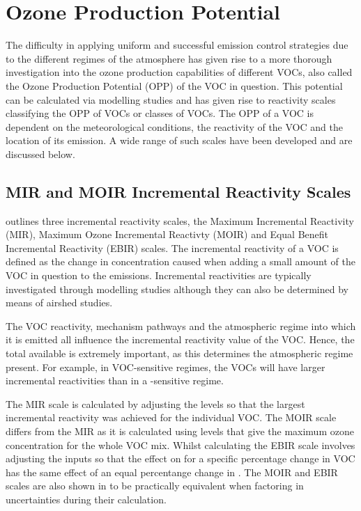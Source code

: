 \section{Ozone Production Potential}
The difficulty in applying uniform and successful emission control strategies due to the different regimes of the atmosphere 
has given rise to a more thorough investigation into the ozone production capabilities of different VOCs, also called the Ozone
Production Potential (OPP) of the VOC in question. This potential can be calculated via modelling studies and has given rise to
reactivity scales classifying the OPP of VOCs or classes of VOCs. The OPP of a VOC is dependent on the meteorological 
conditions, the reactivity of the VOC and the location of its emission. A wide range of such scales have been developed and are
discussed below.

\subsection{MIR and MOIR Incremental Reactivity Scales} \label{s:MIR&MOIR}
\citep{Carter:1994} outlines three incremental reactivity scales, the Maximum Incremental Reactivity (MIR), Maximum Ozone 
Incremental Reactivty (MOIR) and Equal Benefit Incremental Reactivity (EBIR) scales. The incremental reactivity of a VOC is 
defined as the change in  concentration caused when adding a small amount of the VOC in question to the emissions. 
Incremental reactivities are typically investigated through modelling studies although they can also be determined by means of 
airshed studies. 

The VOC reactivity, mechanism pathways and the atmospheric regime into which it is emitted all influence the incremental 
reactivity value of the VOC. Hence, the total  available is extremely important, as this determines the atmospheric 
regime present. For example, in VOC-sensitive regimes, the VOCs will have larger incremental reactivities than in a 
-sensitive regime.

The MIR scale is calculated by adjusting the  levels so that the largest incremental reactivity was achieved for the 
individual VOC. The MOIR scale differs from the MIR as it is calculated using  levels that give the maximum ozone 
concentration for the whole VOC mix.  Whilst calculating the EBIR scale involves adjusting the  inputs so that the 
effect on  for a specific percentage change in VOC has the same effect of an equal percentange change in  
\citep{Carter:1994}. The MOIR and EBIR scales are also shown in \citep{Carter:1994} to be practically equivalent when factoring 
in uncertainties during their calculation.

